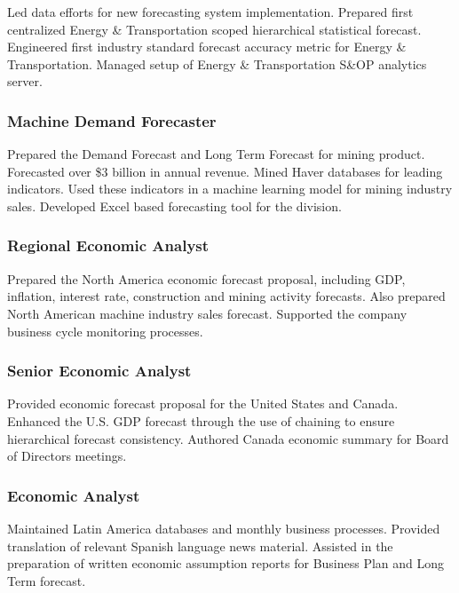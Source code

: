 \documentclass[
  letterpaper,
  DIV=11,
  numbers=noendperiod]{scrartcl}
\begin{document}
Led data efforts for new forecasting system implementation. Prepared
first centralized Energy \& Transportation scoped hierarchical
statistical forecast. Engineered first industry standard forecast
accuracy metric for Energy \& Transportation. Managed setup of Energy \&
Transportation S\&OP analytics server.

\hypertarget{machine-demand-forecaster}{%
\subsubsection{Machine Demand
Forecaster}\label{machine-demand-forecaster}}

Prepared the Demand Forecast and Long Term Forecast for mining product.
Forecasted over \$3 billion in annual revenue. Mined Haver databases for
leading indicators. Used these indicators in a machine learning model
for mining industry sales. Developed Excel based forecasting tool for
the division.

\hypertarget{regional-economic-analyst}{%
\subsubsection{Regional Economic
Analyst}\label{regional-economic-analyst}}

Prepared the North America economic forecast proposal, including GDP,
inflation, interest rate, construction and mining activity forecasts.
Also prepared North American machine industry sales forecast. Supported
the company business cycle monitoring processes.

\hypertarget{senior-economic-analyst}{%
\subsubsection{Senior Economic Analyst}\label{senior-economic-analyst}}

Provided economic forecast proposal for the United States and Canada.
Enhanced the U.S. GDP forecast through the use of chaining to ensure
hierarchical forecast consistency. Authored Canada economic summary for
Board of Directors meetings.

\hypertarget{economic-analyst}{%
\subsubsection{Economic Analyst}\label{economic-analyst}}

Maintained Latin America databases and monthly business processes.
Provided translation of relevant Spanish language news material.
Assisted in the preparation of written economic assumption reports for
Business Plan and Long Term forecast.
\end{document}
